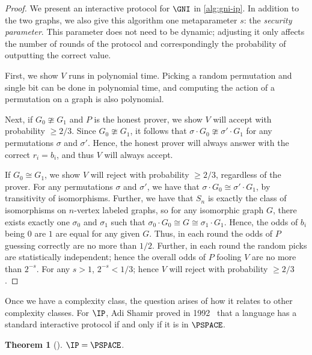 \documentclass[english,12pt]{reedthesis}
\theoremstyle{plain}
\newtheorem{thm}{Theorem}[section]
\theoremstyle{definition}
\theoremstyle{remark}
\begin{document}
\begin{proof}
  We present an interactive protocol for $\GNI$ in \cref{alg:gni-ip}. In
  addition to the two graphs, we also give this algorithm one metaparameter $s$:
  the \emph{security parameter}. This parameter does
  not need to be dynamic; adjusting it only affects the number of rounds of the
  protocol and correspondingly the probability of outputting the correct value.

  First, we show $V$ runs in polynomial time. Picking a random permutation and
  single bit can be done in polynomial time, and computing the action of a
  permutation on a graph is also polynomial.

  Next, if $G_{0} \ncong G_{1}$ and $P$ is the honest prover, we show $V$ will accept
  with probability $\ge 2/3$. Since $G_{0} \ncong G_{1}$, it follows that
  $\sigma \cdot G_{0} \ncong \sigma' \cdot G_{1}$ for any permutations $\sigma$ and $\sigma'$. Hence, the honest
  prover will always answer with the correct $r_{i} = b_{i}$, and thus $V$ will
  always accept.

  If $G_{0} \cong G_{1}$, we show $V$ will reject with probability $\ge 2/3$,
  regardless of the prover. For any permutations $\sigma$ and $\sigma'$, we have that
  $\sigma \cdot G_{0} \cong \sigma' \cdot G_{1}$, by transitivity of isomorphisms. Further, we have
  that $S_{n}$ is exactly the class of isomorphisms on $n$-vertex labeled
  graphs, so for any isomorphic graph $G$, there exists exactly one $\sigma_{0}$ and
  $\sigma_{1}$ such that $\sigma_{0} \cdot G_{0} \cong G \cong \sigma_{1} \cdot G_{1}$. Hence, the odds of
  $b_{i}$ being $0$ are $1$ are equal for any given $G$. Thus, in each round the
  odds of $P$ guessing correctly are no more than $1/2$. Further, in each round
  the random picks are statistically independent; hence the overall odds of $P$
  fooling $V$ are no more than $2^{-s}$. For any $s > 1$, $2^{-s} < 1/3$; hence
  $V$ will reject with probability $\ge 2/3$.
\end{proof}

Once we have a complexity class, the question arises of how it relates to other
complexity classes. For $\IP$, Adi Shamir proved in 1992~\cite{Sha92} that a
language has a standard interactive protocol if and only if it is in $\PSPACE$.

\begin{thm}[{\cite{Sha92}}]\label{thm:ip-is-pspace}
  $\IP = \PSPACE$.
\end{thm}
\end{document}
